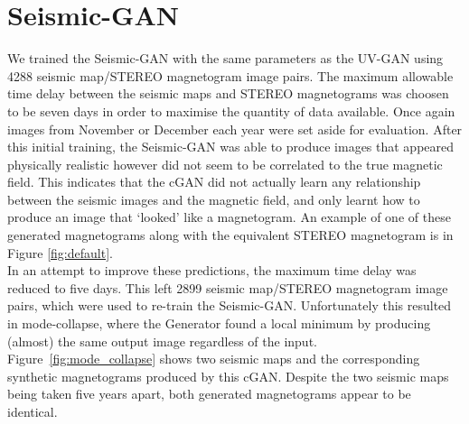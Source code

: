 \documentclass[11pt,a4paper,onecolumn]{report}
\begin{document}
\section{Seismic-GAN}
\label{sec:train_seismic}

We trained the Seismic-GAN with the same parameters as the UV-GAN using 4288
seismic map/STEREO magnetogram image pairs. The maximum allowable time delay
between the seismic maps and STEREO magnetograms was choosen to be seven days in
order to maximise the quantity of data available. Once again images from
November or December each year were set aside for evaluation. After this initial
training, the Seismic-GAN was able to produce images that appeared physically
realistic however did not seem to be correlated to the true magnetic field. This
indicates that the cGAN did not actually learn any relationship between the
seismic images and the magnetic field, and only learnt how to produce an image
that `looked' like a magnetogram. An example of one of these generated
magnetograms along with the equivalent STEREO magnetogram is in Figure
\ref{fig:default}. \\



In an attempt to improve these predictions, the maximum time delay was reduced
to five days. %
This left 2899 seismic map/STEREO magnetogram image pairs, which were used to
re-train the Seismic-GAN. Unfortunately this resulted in mode-collapse, where
the Generator found a local minimum by producing (almost) the same output
image regardless of the input. Figure~\ref{fig:mode_collapse} shows two seismic
maps and the corresponding synthetic magnetograms produced by this cGAN. Despite
the two seismic maps being taken five years apart, both generated magnetograms
appear to be identical.\\
\end{document}
